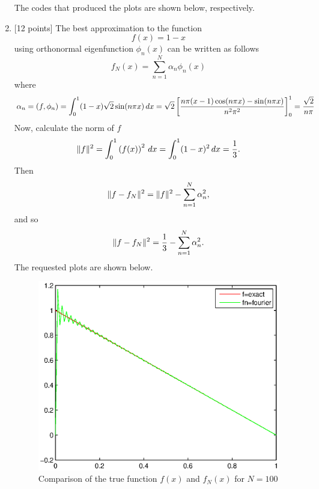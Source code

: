 \begin{solution}
\begin{enumerate}
\newpage
The codes that produced the plots are shown below, respectively.



\item {[12 points]} The best approximation to the function $$f(x) = 1 - x$$ using orthonormal eigenfunction $\phi_n (x)$ can be written as follows
\[
f_N (x) = \sum_{n=1}^N \alpha _n \phi_n (x)\]
where
\[
\alpha_n= (f, \phi_n)=\int_0^1 (1-x) \sqrt{2}\sin(n \pi x) \, dx= \sqrt{2} \left[\frac{n \pi (x-1) \cos (n \pi x) - \sin(n \pi x)}{n^2 \pi^2}\right]_0^1 = \frac{\sqrt{2}}{n \pi}
\]
Now, calculate the norm of $f$
 \[
\|f\|^2=\int_0^1\left(f(x)\right)^2\,dx=\int_0^1(1-x)^2 \,dx=\frac{1}{3}.
\]
Then
\[
\|f-f_N\|^2 = \|f\|^2 - \sum_{n=1}^N \alpha_n^2,
\]
and so
\[
\|f-f_N\|^2 = \frac{1}{3} - \sum_{n=1}^N \alpha_n^2.
\]
The requested plots are shown below. 


\begin{figure}
\centering
\includegraphics[scale=0.9]{ffnc}
\vspace{-.5cm}
\caption{Comparison of the true function $f(x)$ and $f_N(x)$ for $N = 100$}
\end{figure}


\end{enumerate}
\end{solution}
